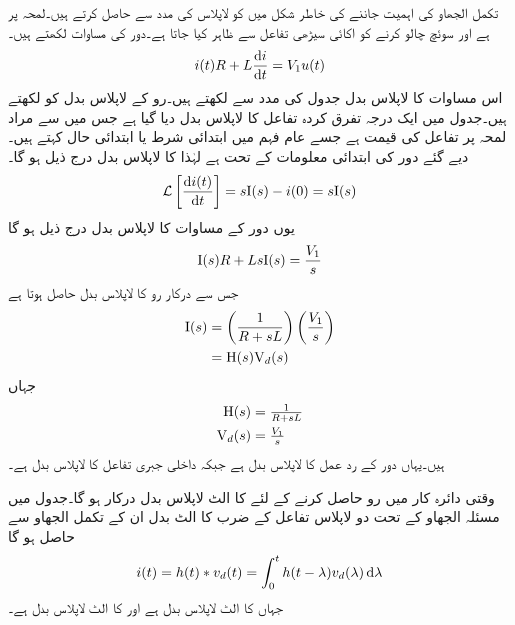 تکمل الجھاو کی اہمیت جاننے کی خاطر  شکل  میں  کو لاپلاس کی مدد سے حاصل کرتے ہیں۔لمحہ  پر  ہے اور سوئچ چالو کرنے کو اکائی سیڑھی تفاعل  سے ظاہر کیا جاتا ہے۔دور کی مساوات لکھتے ہیں۔
\begin{align*}
i(t)R+L\frac{\dif i}{\dif t}=V_1 u(t)
\end{align*}
اس مساوات کا لاپلاس بدل جدول  کی مدد سے لکھتے ہیں۔رو کے لاپلاس بدل کو  لکھتے ہیں۔جدول میں ایک درجہ تفرق کردہ تفاعل کا لاپلاس بدل دیا گیا ہے جس میں  سے مراد لمحہ  پر تفاعل کی قیمت ہے جسے عام فہم میں ابتدائی شرط یا ابتدائی حال کہتے ہیں۔دیے گئے دور کی ابتدائی معلومات کے تحت  ہے لہٰذا  کا لاپلاس بدل درج ذیل ہو گا۔
\begin{align*}
\Laplace\left[\frac{\dif i(t)}{\dif t}\right]=s\bI(s)-i(0)=s\bI(s)
\end{align*} 
یوں دور کے مساوات کا لاپلاس بدل درج ذیل ہو گا
\begin{align*}
{\ensuremath{{\textup{I}}}}(s)R+Ls{{\textup{I}}}(s)=\frac{V_1}{s}
\end{align*}
جس سے درکار رو کا لاپلاس بدل حاصل ہوتا ہے
\begin{gather}
\begin{aligned}\label{مساوات_لاپلاس_دور_ردعمل_الف}
{\ensuremath{{\textup{I}}}}(s)&=\left(\frac{1}{R+sL}\right)\left(\frac{V_1}{s}\right)\\
&={{\textup{H}}}(s) {{\textup{V}}}_d(s)
\end{aligned}
\end{gather}
جہاں
\begin{align*}
{\ensuremath{{\textup{H}}}}(s)&=\tfrac{1}{R+sL}\\
{{\textup{V}}}_{d}(s)&=\tfrac{V_1}{s}
\end{align*}
ہیں۔یہاں  دور کے رد عمل کا لاپلاس بدل ہے جبکہ  داخلی جبری تفاعل کا لاپلاس بدل ہے۔

وقتی دائرہ کار میں رو  حاصل کرنے کے لئے  کا الٹ لاپلاس بدل درکار ہو گا۔جدول  میں مسئلہ الجھاو کے تحت دو لاپلاس تفاعل کے ضرب کا الٹ بدل ان کے تکمل الجھاو سے حاصل ہو گا
\begin{align}\label{مساوات_لاپلاس_دور_ردعمل_ب}
i(t)=h(t) \ast v_d(t)=\int_0^t h(t-\lambda) v_d(\lambda) \dif \lambda
\end{align}
جہاں  کا الٹ لاپلاس بدل  ہے اور  کا الٹ لاپلاس بدل  ہے۔


